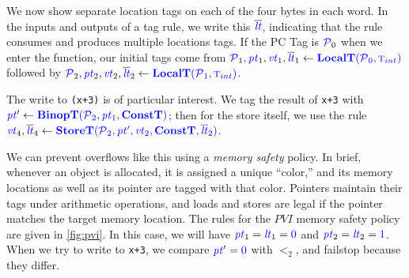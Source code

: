 \documentclass{llncs}
\begin{document}
We now show separate location tags on each of the four bytes in each word. In the inputs and outputs
of a tag rule, we write this \(\lts\), indicating that the rule consumes and produces multiple locations tags.
If the PC Tag is \(\PCT_0\) when we enter the function,
our initial tags come from \(\PCT_1,\pt_1,\vt_1,\lts_1 \leftarrow \localtname(\PCT_0,\TN[int])\)
followed by \(\PCT_2,\pt_2,\vt_2,\lts_2 \leftarrow \localtname(\PCT_1,\TN[int])\).

The write to {\tt *(x+3)} is of particular interest. We tag the result of {\tt x+3}
with \(\pt' \leftarrow \binoptname(\PCT_2, \pt_1, \constt)\); then for the store itself,
we use the rule \(\vt_4, \lts_4 \leftarrow \storetname(\PCT_2, \pt', \vt_2, \constt, \lts_2)\).

We can prevent overflows like this using a {\em memory safety} policy. In brief, whenever
an object is allocated, it is assigned a unique ``color,'' and its memory locations as well
as its pointer are tagged with that color. Pointers maintain their tags under arithmetic
operations, and loads and stores are legal if the pointer matches the target memory location.
The rules for the \(PVI\) memory safety policy are given in \cref{fig:pvi}. In this case, we will
have \(\pt_1 = \lt_1 = \tagz\) and \(\pt_2 = \lt_2 = \tagone\). When we try to write to {\tt x+3},
we compare \(\pt' = \tagz\) with \(\lt_2\), and failstop because they differ.

\end{document}
